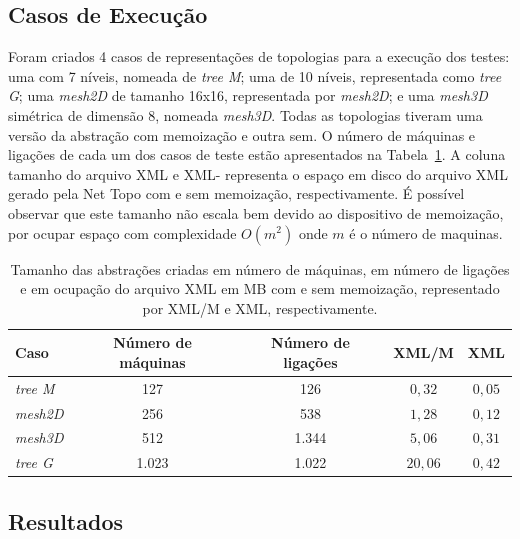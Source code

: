 \subsection{Casos de Execução}
\label{sec:bench:cases}

Foram criados 4 casos de representações de topologias para a execução dos testes: uma \fatt com 7 níveis, nomeada de \textit{tree M}; uma \fatt de 10 níveis, representada como \textit{tree G}; uma \textit{mesh2D} de tamanho 16x16,  representada por \textit{mesh2D}; e uma \textit{mesh3D} simétrica de dimensão 8, nomeada \textit{mesh3D}.
Todas as topologias tiveram uma versão da abstração com memoização e outra sem. 
O número de máquinas e ligações de cada um dos casos de teste estão apresentados na Tabela~\ref{tab:sizes_topos}.
A coluna tamanho do arquivo XML e XML- representa o espaço em disco do arquivo XML gerado pela Net Topo com e sem memoização, respectivamente.
É possível observar que este tamanho não escala bem devido ao dispositivo de memoização, por ocupar espaço com complexidade $O(m^2)$ onde $m$ é o número de maquinas.

\setlength{\tabcolsep}{0.5em}
\begin{table}[!ht]
    \centering
    \begin{tabular}{l c c c c}
        \toprule
        \textbf{Caso} &    \textbf{Número de máquinas}  & \textbf{Número de ligações}  & \textbf{XML/M} & \textbf{XML} \\ \midrule
        \textit{tree M} & 127 & 126   & $0,32$  & $0,05$ \\ %
        \textit{mesh2D} & 256 & 538   & $1,28$  & $0,12$  \\ %
        \textit{mesh3D} & 512 & 1.344  & $5,06$  & $0,31$  \\ %
        \textit{tree G} & 1.023 & 1.022 & $20,06$ & $0,42$  \\ \bottomrule
    \end{tabular}
    \caption[Tamanho das topologias]{Tamanho das abstrações criadas em número de máquinas, em número de ligações e em ocupação do arquivo XML em MB com e sem memoização, representado por XML/M e XML, respectivamente.}
    \label{tab:sizes_topos}
\end{table}

\subsection{Resultados}

